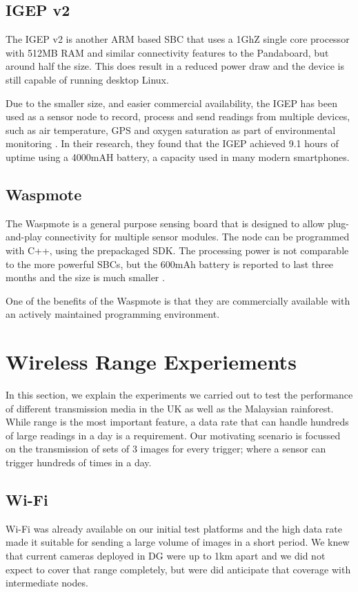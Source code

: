 \subsection{IGEP v2}

The IGEP v2 is another ARM based SBC that uses a 1GhZ single core processor with 512MB RAM and similar connectivity features to the Pandaboard, but around half the size. This does result in a reduced power draw and the device is still capable of running desktop Linux.

Due to the smaller size, and easier commercial availability, the IGEP has been used as a sensor node to record, process and send readings from multiple devices, such as air temperature, GPS and oxygen saturation as part of environmental monitoring \cite{Resch}. In their research, they found that the IGEP achieved 9.1 hours of uptime using a 4000mAH battery, a capacity used in many modern smartphones.

\subsection{Waspmote}
The Waspmote is a general purpose sensing board that is designed to allow plug-and-play connectivity for multiple sensor modules. The node can be programmed with C++, using the prepackaged SDK. The processing power is not comparable to the more powerful SBCs, but the 600mAh battery is reported to last three months and the size is much smaller \cite{Lib}.

One of the benefits of the Waspmote is that they are commercially available with an actively maintained programming environment.

\section{Wireless Range Experiements}
	In this section, we explain the experiments we carried out to test the performance of different transmission media in the UK as well as the Malaysian rainforest. While range is the most important feature, a data rate that can handle hundreds of large readings in a day is a requirement. Our motivating scenario is focussed on the transmission of sets of 3 images for every trigger; where a sensor can trigger hundreds of times in a day.

\subsection{Wi-Fi}\label{tech:wifirange}
Wi-Fi was already available on our initial test platforms and the high data rate made it suitable for sending a large volume of images in a short period. We knew that current cameras deployed in DG were up to 1km apart and we did not expect to cover that range completely, but were did anticipate that coverage with intermediate nodes.


